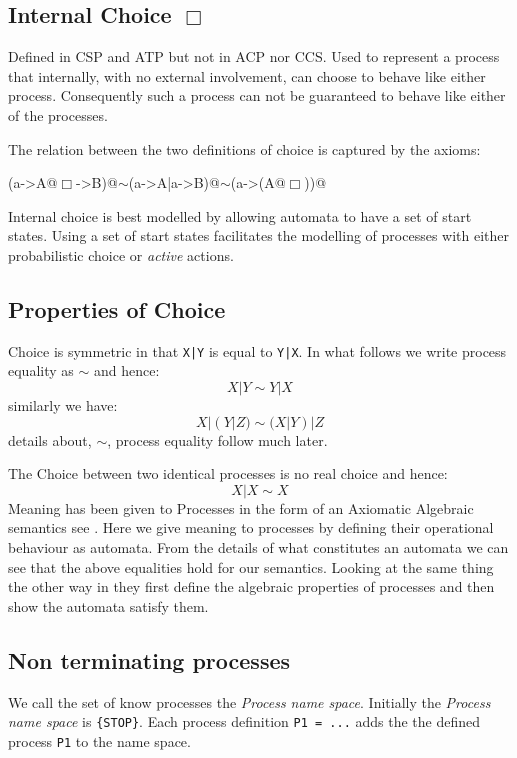 \documentclass[]{article}
\begin{document}
{\color{red}
\subsection{Internal  Choice $\Box$}
Defined in CSP and ATP but not in ACP nor CCS.
Used to represent a process that internally, with no external involvement, can choose to behave like either process. Consequently such a process can not be guaranteed to behave like either of the processes.

The relation between the two definitions of choice is captured by the axioms:

\begin{center}
\verb@(a->A@$ \Box $\verb@a->B)@$ \sim$\verb@(a->A|a->B)@$ \sim $\verb@(a->(A@$\Box $\verb@B))@
\end{center}

Internal choice is best modelled by allowing automata to have a set of start states. Using a set of start states  facilitates the modelling of processes  with either  probabilistic choice or  \emph{active} actions.

}
\subsection{Properties of Choice}
 Choice is symmetric in that \verb$X|Y$ is equal to \verb$Y|X$. In what follows we write process equality as $\sim$ and hence:
 \[X|Y\sim Y|X\]
 similarly we have:
 \[X|(Y|Z)\sim (X|Y)|Z\]
 details about, $\sim$,  process equality follow much later. 

The Choice between two identical processes is no real choice and hence:
\[X|X\sim X\]
Meaning has been  given to Processes in the form of an Axiomatic Algebraic semantics see \cite{BaW90}. Here we give meaning to processes by defining their operational behaviour as automata. From the details of what constitutes an automata we can see that the above equalities hold for our semantics. Looking at the same thing the other way in \cite{BaW90} they first define the algebraic properties of processes and then show the automata satisfy them.

\subsection{Non terminating processes}
We call the set of know  processes  the  \emph{Process name space}.   Initially the  \emph{Process name space} is \verb${STOP}$.    Each process definition \verb$P1 = ...$ adds the the defined process \verb$P1$ to the name space.
\end{document}
